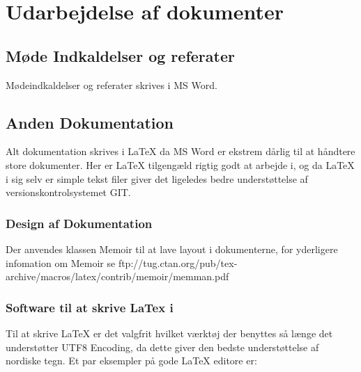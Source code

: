 \chapter{Udarbejdelse af dokumenter}

\section{Møde Indkaldelser og referater}
Mødeindkaldelser og referater skrives i MS Word.

\section{Anden Dokumentation}
Alt dokumentation skrives i LaTeX da MS Word er ekstrem dårlig til at håndtere store dokumenter. Her er LaTeX tilgengæld rigtig godt at arbejde i, og da LaTeX i sig selv er simple tekst filer giver det ligeledes bedre understøttelse af versionskontrolsystemet GIT.
\subsection{Design af Dokumentation}
Der anvendes klassen Memoir til at lave layout i dokumenterne, for yderligere infomation om Memoir se ftp://tug.ctan.org/pub/tex-archive/macros/latex/contrib/memoir/memman.pdf
\subsection{Software til at skrive LaTex i}
Til at skrive LaTeX er det valgfrit hvilket værktøj der benyttes så længe det understøtter UTF8 Encoding, da dette giver den bedste understøttelse af nordiske tegn.
Et par eksempler på gode LaTeX editore er:
